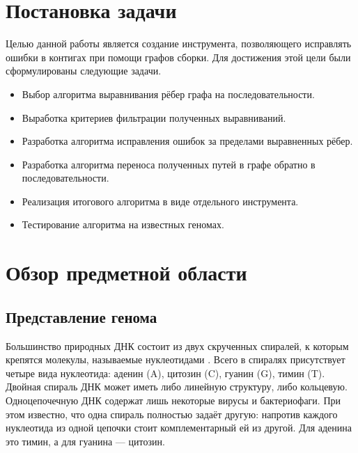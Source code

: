 \documentclass[14pt]{matmex-diploma-custom}
\begin{document}
%
%
%
%





\section{Постановка задачи}
Целью данной работы является создание инструмента, позволяющего исправлять ошибки в контигах при помощи графов сборки. Для достижения этой цели были сформулированы следующие задачи.
\begin{itemize}
    \item Выбор алгоритма выравнивания рёбер графа на последовательности.
    \item Выработка критериев фильтрации полученных выравниваний.
    \item Разработка алгоритма исправления ошибок за пределами выравненных рёбер.
    \item Разработка алгоритма переноса полученных путей в графе обратно в последовательности.
    \item Реализация итогового алгоритма в виде отдельного инструмента.
    \item Тестирование алгоритма на известных геномах.
\end{itemize}

\section{Обзор предметной области}
\subsection{Представление генома}
Большинство природных ДНК состоит из двух скрученных спиралей, к которым крепятся молекулы, называемые нуклеотидами \cite{art:Watson}. Всего в спиралях присутствует четыре вида нуклеотида: аденин (A), цитозин (C), гуанин (G), тимин (T). Двойная спираль ДНК может иметь либо линейную структуру, либо кольцевую. Одноцепочечную ДНК содержат лишь некоторые вирусы и бактериофаги. При этом известно, что одна спираль полностью задаёт другую: напротив каждого нуклеотида из одной цепочки стоит комплементарный ей из другой. Для аденина это тимин, а для гуанина --- цитозин.
\end{document}
